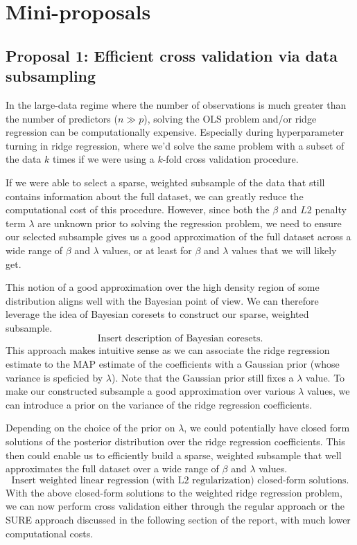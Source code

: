 

\section{Mini-proposals}

\subsection{Proposal 1: Efficient cross validation via data subsampling} %
In the large-data regime where the number of observations is much greater than the number of predictors ($n\gg p$), solving the OLS problem and/or ridge regression can be computationally expensive. Especially during hyperparameter turning in ridge regression, where we'd solve the same problem with a subset of the data $k$ times if we were using a $k$-fold cross validation procedure. 

If we were able to select a sparse, weighted subsample of the data that still contains information about the full dataset, we can greatly reduce the computational cost of this procedure. However, since both the $\beta$ and $L2$ penalty term $\lambda$ are unknown prior to solving the regression problem, we need to ensure our selected subsample gives us a good approximation of the full dataset across a wide range of $\beta$ and $\lambda$ values, or at least for $\beta$ and $\lambda$ values that we will likely get.

This notion of a good approximation over the high density region of some distribution aligns well with the Bayesian point of view. We can therefore leverage the idea of Bayesian coresets to construct our sparse, weighted subsample.
\[
\text{Insert description of Bayesian coresets.}
\]
This approach makes intuitive sense as we can associate the ridge regression estimate to the MAP estimate of the coefficients with a Gaussian prior (whose variance is speficied by $\lambda$). Note that the Gaussian prior still fixes a $\lambda$ value. To make our constructed subsample a good approximation over various $\lambda$ values, we can introduce a prior on the variance of the ridge regression coefficients. 

Depending on the choice of the prior on $\lambda$, we could potentially have closed form solutions of the posterior distribution over the ridge regression coefficients. This then could enable us to efficiently build a sparse, weighted subsample that well approximates the full dataset over a wide range of $\beta$ and $\lambda$ values.
\[
\text{Insert weighted linear regression (with L2 regularization) closed-form solutions.}
\]
With the above closed-form solutions to the weighted ridge regression problem, we can now perform cross validation either through the regular approach or the SURE approach discussed in the following section of the report, with much lower computational costs.

